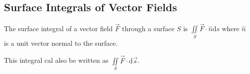 \subsection{Surface Integrals of Vector Fields}
\begin{definition}
	The surface integral of a vector field $\vec{F}$ through a surface $S$ is $\iint\limits_{S}{\vec{F}\cdot\hat{n}\mathrm{d}s}$ where $\hat{n}$ is a unit vector normal to the surface.
\end{definition}
\noindent
This integral cal also be written as $\iint\limits_{S}{\vec{F}\cdot\mathrm{d}\vec{s}}$.

